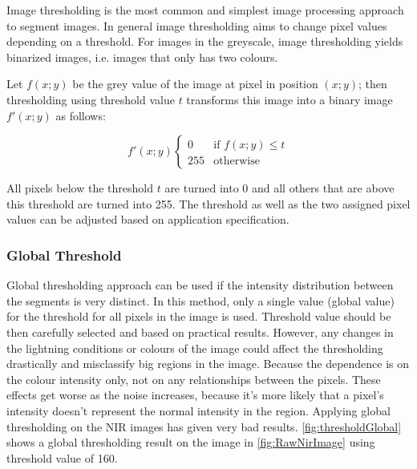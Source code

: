 Image thresholding is the most common and simplest image processing approach to segment images. In general image thresholding aims to change pixel values depending on a threshold. For images in the greyscale, image thresholding yields binarized images, i.e. images that only has two colours. 

Let $f(x; y)$ be the grey value of the image at pixel in position $(x; y)$; then thresholding using threshold value $t$ transforms this image into a binary image $f'(x; y)$ as follows:

\begin{equation}
\mathcal{} f'(x; y)
  \begin{cases}
    0 & \text{if $f(x; y) \leq t$} \\

    255 & \text{otherwise}
  \end{cases}
\end{equation}

All pixels below the threshold $t$ are turned into 0 and all others that are above this threshold are turned into 255. The threshold as well as the two assigned pixel values can be adjusted based on application specification.

\subsubsection{Global Threshold}
Global thresholding approach can be used if the intensity distribution between the segments is very distinct. In this method, only a single value (global value) for the threshold for all pixels in the image is used. Threshold value should be then carefully selected and based on practical results. However, any changes in the lightning conditions or colours of the image could affect the thresholding drastically and misclassify big regions in the image. Because the dependence is on the colour intensity only, not on any relationships between the pixels. These effects get worse as the noise increases, because it’s more likely that a pixel’s intensity doesn’t represent the normal intensity in the region. 
Applying global thresholding on the NIR images has given very bad results. \autoref{fig:thresholdGlobal} shows a global thresholding result on the image in \autoref{fig:RawNirImage} using threshold value of 160.

